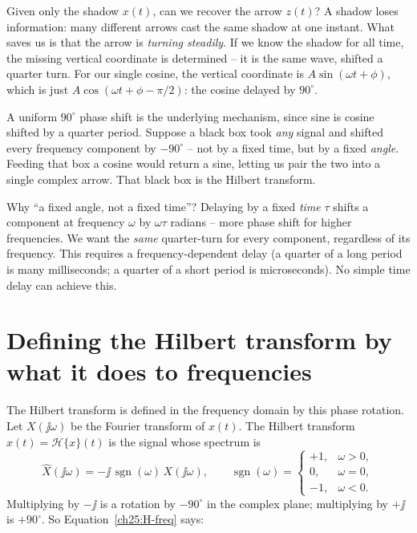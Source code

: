 Given only the shadow $x(t)$, can we recover the arrow $z(t)$? A
shadow loses information: many different arrows cast the same shadow at one instant.
What saves us is that the arrow is \emph{turning steadily}. If we know the shadow for
all time, the missing vertical coordinate is determined -- it is the same wave, shifted a
quarter turn. For our single cosine, the vertical coordinate is $A\sin(\omega t+\phi)$,
which is just $A\cos(\omega t + \phi - \pi/2)$: the cosine delayed by $90^\circ$.

\begin{intuitionbox}
A uniform $90^\circ$ phase shift is the underlying mechanism, since sine is cosine shifted by a quarter
period. Suppose a black box took \emph{any} signal and shifted every frequency
component by $-90^\circ$ -- not by a fixed time, but by a fixed \emph{angle}.
Feeding that box a cosine would return a sine, letting us pair the two into
a single complex arrow. That black box is the Hilbert transform.
\end{intuitionbox}

Why ``a fixed angle, not a fixed time''? Delaying by a fixed \emph{time} $\tau$ shifts a
component at frequency $\omega$ by $\omega\tau$ radians -- more phase shift for higher
frequencies. We want the \emph{same} quarter-turn for every component, regardless of its
frequency. This requires a frequency-dependent delay (a quarter of a long period is many milliseconds; a quarter of a short period is microseconds). No simple time delay can achieve this.

\section{Defining the Hilbert transform by what it does to frequencies}
\label{ch25:defn-freq}

The Hilbert transform is defined in the frequency domain by this phase rotation. Let $X(\jj\omega)$ be the Fourier transform
of $x(t)$. The Hilbert transform $\hat{x}(t) = \mathcal{H}\{x\}(t)$ is the signal whose
spectrum is
\begin{equation}
\label{ch25:H-freq}
\widehat{X}(\jj\omega) = -\jj\,\operatorname{sgn}(\omega)\, X(\jj\omega),
\qquad
\operatorname{sgn}(\omega) =
\begin{cases}
+1, & \omega > 0,\\
0, & \omega = 0,\\
-1, & \omega < 0.
\end{cases}
\end{equation}
Multiplying by $-\jj$ is a rotation by $-90^\circ$ in the
complex plane; multiplying by $+\jj$ is $+90^\circ$. So
Equation~\eqref{ch25:H-freq} says:

